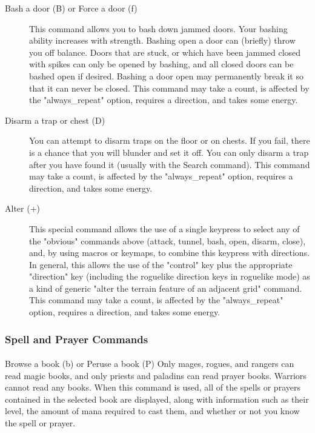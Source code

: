 \begin{description}
    \item[Bash a door (B) or Force a door (f)] This command allows you
        to bash down jammed doors. Your bashing ability increases with
        strength. Bashing open a door can (briefly) throw you off
        balance. Doors that are stuck, or which have been jammed closed
        with spikes can only be opened by bashing, and all closed doors
        can be bashed open if desired. Bashing a door open may
        permanently break it so that it can never be closed. This
        command may take a count, is affected by the "always\_repeat"
        option, requires a direction, and takes some energy.

    \item[Disarm a trap or chest (D)] You can attempt to disarm traps on
        the floor or on chests. If you fail, there is a chance that you
        will blunder and set it off. You can only disarm a trap after
        you have found it (usually with the Search command). This
        command may take a count, is affected by the "always\_repeat"
        option, requires a direction, and takes some energy.

    \item[Alter (+)] This special command allows the use of a single
        keypress to select any of the "obvious" commands above (attack,
        tunnel, bash, open, disarm, close), and, by using macros or
        keymaps, to combine this keypress with directions. In general,
        this allows the use of the "control" key plus the appropriate
        "direction" key (including the roguelike direction keys in
        roguelike mode) as a kind of generic "alter the terrain feature
        of an adjacent grid" command. This command may take a count, is
        affected by the "always\_repeat" option, requires a direction,
        and takes some energy.  \end{description}

\subsubsection{Spell and Prayer Commands} 
\paragraph{}Browse a book (b)
or Peruse a book (P) Only mages, rogues, and rangers can read magic
books, and only priests and paladins can read prayer books. Warriors
cannot read any books. When this command is used, all of the spells or
prayers contained in the selected book are displayed, along with
information such as their level, the amount of mana required to cast
them, and whether or not you know the spell or prayer.

